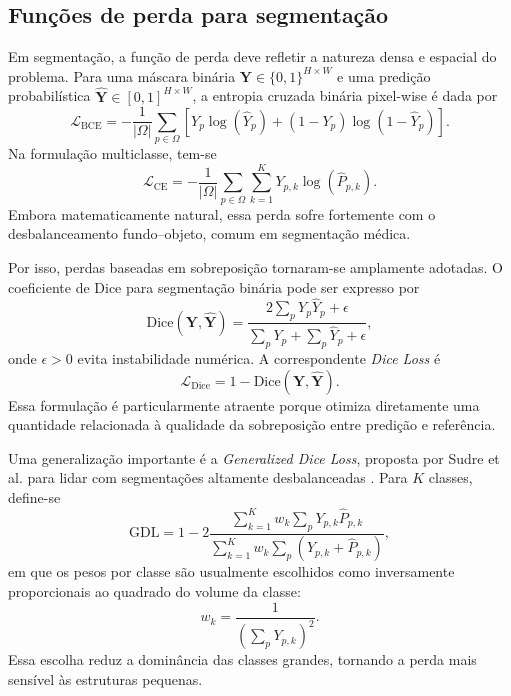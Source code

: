 \documentclass[tcc,capa]{texufpel}
\begin{document}
\subsection{Funções de perda para segmentação}

Em segmentação, a função de perda deve refletir a natureza densa e espacial do problema. Para uma máscara binária \(\mathbf{Y} \in \{0,1\}^{H\times W}\) e uma predição probabilística \(\hat{\mathbf{Y}} \in [0,1]^{H\times W}\), a entropia cruzada binária pixel-wise é dada por
\begin{equation}
	\mathcal{L}_{\text{BCE}}
	=
	-\frac{1}{|\Omega|}
	\sum_{p \in \Omega}
	\left[
	Y_p \log(\hat{Y}_p) + (1-Y_p)\log(1-\hat{Y}_p)
	\right].
\end{equation}
Na formulação multiclasse, tem-se
\begin{equation}
	\mathcal{L}_{\text{CE}}
	=
	-\frac{1}{|\Omega|}
	\sum_{p \in \Omega}
	\sum_{k=1}^{K}
	Y_{p,k}\log(\hat{P}_{p,k}).
\end{equation}
Embora matematicamente natural, essa perda sofre fortemente com o desbalanceamento fundo--objeto, comum em segmentação médica.

Por isso, perdas baseadas em sobreposição tornaram-se amplamente adotadas. O coeficiente de Dice para segmentação binária pode ser expresso por
\begin{equation}
	\mathrm{Dice}(\mathbf{Y},\hat{\mathbf{Y}})
	=
	\frac{2\sum_{p} Y_p \hat{Y}_p + \epsilon}
	{\sum_{p} Y_p + \sum_{p} \hat{Y}_p + \epsilon},
\end{equation}
onde \(\epsilon > 0\) evita instabilidade numérica. A correspondente \textit{Dice Loss} é
\begin{equation}
	\mathcal{L}_{\text{Dice}}
	=
	1 - \mathrm{Dice}(\mathbf{Y},\hat{\mathbf{Y}}).
\end{equation}
Essa formulação é particularmente atraente porque otimiza diretamente uma quantidade relacionada à qualidade da sobreposição entre predição e referência.

Uma generalização importante é a \textit{Generalized Dice Loss}, proposta por Sudre et al. para lidar com segmentações altamente desbalanceadas \cite{Sudre2017GDL}. Para \(K\) classes, define-se
\begin{equation}
	\mathrm{GDL}
	=
	1 -
	2
	\frac{
		\sum_{k=1}^{K} w_k \sum_{p} Y_{p,k}\hat{P}_{p,k}
	}{
		\sum_{k=1}^{K} w_k \sum_{p} \left(Y_{p,k} + \hat{P}_{p,k}\right)
	},
\end{equation}
em que os pesos por classe são usualmente escolhidos como inversamente proporcionais ao quadrado do volume da classe:
\begin{equation}
	w_k = \frac{1}{\left(\sum_{p} Y_{p,k}\right)^2}.
\end{equation}
Essa escolha reduz a dominância das classes grandes, tornando a perda mais sensível às estruturas pequenas.
\end{document}
